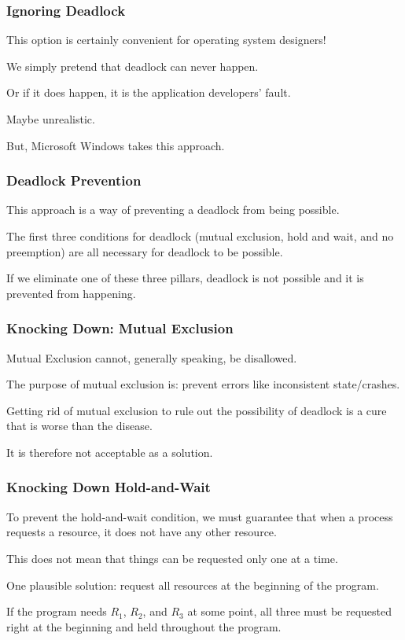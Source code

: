 \begin{frame}
\frametitle{Ignoring Deadlock}

This option is certainly convenient for operating system designers!

We simply pretend that deadlock can never happen. 

Or if it does happen, it is the application developers' fault. 

Maybe unrealistic.

But, Microsoft Windows takes this approach.

\end{frame}

\begin{frame}
\frametitle{Deadlock Prevention}

This approach is a way of preventing a deadlock from being possible. 

The first three conditions for deadlock (mutual exclusion, hold and wait, and no preemption) are all necessary for deadlock to be possible. 

If we eliminate one of these three pillars, deadlock is not possible and it is prevented from happening.

\end{frame}

\begin{frame}
\frametitle{Knocking Down: Mutual Exclusion}

Mutual Exclusion cannot, generally speaking, be disallowed. 

The purpose of  mutual exclusion is: prevent errors like inconsistent state/crashes. 

Getting rid of mutual exclusion to rule out the possibility of deadlock is a cure that is worse than the disease.

It is therefore not acceptable as a solution.


\end{frame}

\begin{frame}
\frametitle{Knocking Down Hold-and-Wait}
 To prevent the hold-and-wait condition, we must guarantee that when a process requests a resource, it does not have any other resource. 
 
This does not mean that things can be requested only one at a time.

One plausible solution: request all resources at the beginning of the program.

If the program needs $R_{1}$, $R_{2}$, and $R_{3}$ at some point, all three must be requested right at the beginning and held throughout the program.

\end{frame}

